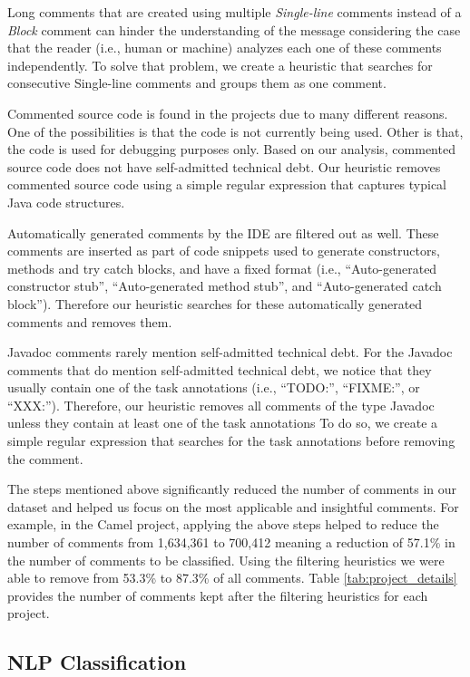 Long comments that are created using multiple \emph{Single-line} comments instead of a \emph{Block} comment can hinder the understanding of the message considering the case that the reader (i.e., human or machine) analyzes each one of these comments independently. To solve that problem, we create a heuristic that searches for consecutive Single-line comments and groups them as one comment.
 
Commented source code is found in the projects due to many different reasons. One of the possibilities is that the code is not currently being used. Other is that, the code is used for debugging purposes only. Based on our analysis, commented source code does not have self-admitted technical debt. Our heuristic removes commented source code using a simple regular expression that captures typical Java code structures.

Automatically generated comments by the IDE are filtered out as well. These comments are inserted as part of code snippets used to generate constructors, methods and try catch blocks, and have a fixed format (i.e., ``Auto-generated constructor stub'', ``Auto-generated method stub'', and ``Auto-generated catch block''). Therefore our heuristic searches for these automatically generated comments and removes them. 

Javadoc comments rarely mention self-admitted technical debt. For the Javadoc comments that do mention self-admitted technical debt, we notice that they usually contain one of the task annotations (i.e., ``TODO:'', ``FIXME:'', or ``XXX:''). Therefore, our heuristic removes all comments of the type Javadoc unless they contain at least one of the task annotations  To do so, we create a simple regular expression that searches for the task annotations before removing the comment.  

The steps mentioned above significantly reduced the number of comments in our dataset and helped us focus on the most applicable and insightful comments. For example, in the Camel project, applying the above steps helped to reduce the number of comments from 1,634,361 to 700,412 meaning a reduction of 57.1\% in the number of comments to be classified. Using the filtering heuristics we were able to remove from 53.3\% to 87.3\% of all comments. Table \ref{tab:project_details} provides the number of comments kept after the filtering heuristics for each project.

\subsection*{NLP Classification}
\label{sub:nlp_classification}

